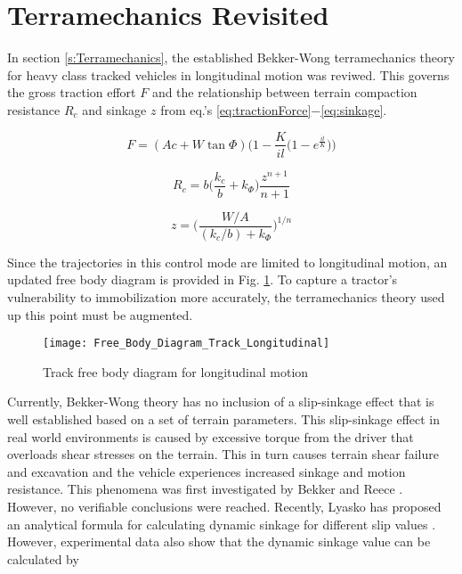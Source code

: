 \section{Terramechanics Revisited}
\label{s:Terramechanics_Revisited}
In section \ref{s:Terramechanics}, the established Bekker-Wong terramechanics theory for heavy class tracked vehicles in longitudinal motion was reviwed. This governs the gross traction effort $F$ and the relationship between terrain compaction resistance $R_c$ and sinkage $z$ from eq.'s \ref{eq:tractionForce}$-$\ref{eq:sinkage}.
\begin{linenomath*}
    \begin{equation*}
        F = (Ac + W\tan\Phi) \Big(1 - \frac{K}{il} \Big(1 - e^{\frac{il}{K}}\Big) \Big)
    \end{equation*}
\end{linenomath*}
\begin{linenomath*}
    \begin{equation*}
        R_c = b\bigg(\frac{k_c}{b} + k_\Phi\bigg)\frac{z^{n+1}}{n+1}
    \end{equation*}
\end{linenomath*}
\begin{linenomath*}
    \begin{equation*}
        z = \bigg(\frac{W/A}{(k_c/b) + k_\Phi}\bigg)^{1/n}
    \end{equation*}
\end{linenomath*}
Since the trajectories in this control mode are limited to longitudinal motion, an updated free body diagram is provided in Fig. \ref{fig:Free_Body_Diagram_Track_Longitudinal}. To capture a tractor's vulnerability to immobilization more accurately, the terramechanics theory used up this point must be augmented. 
\begin{figure}[b]
    \centering
    \texttt{[image: Free\_Body\_Diagram\_Track\_Longitudinal]}
    \caption{Track free body diagram for longitudinal motion}
    \label{fig:Free_Body_Diagram_Track_Longitudinal}
\end{figure}
Currently, Bekker-Wong theory has no inclusion of a slip-sinkage effect that is well established based on a set of terrain parameters. This slip-sinkage effect in real world environments is caused by excessive torque from the driver that overloads shear stresses on the terrain. This in turn causes terrain shear failure and excavation and the vehicle experiences increased sinkage and motion resistance. This phenomena was first investigated by Bekker and Reece \cite{Bekker1969,reece1965principles,reece1964problems}. However, no verifiable conclusions were reached. Recently, Lyasko has proposed an analytical formula for calculating dynamic sinkage for different slip values \cite{lyasko2010slip}. However, experimental data also show that the dynamic sinkage value can be calculated by

